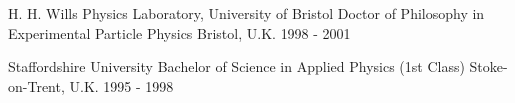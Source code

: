 

\begin{cventries}

    \award
    {H. H. Wills Physics Laboratory, University of Bristol} %
    {Doctor of Philosophy in Experimental Particle Physics} %
    {Bristol, U.K.} %
    {1998 - 2001} %
    {}

    \award
    {Staffordshire University} %
    {Bachelor of Science in Applied Physics (1st Class)} %
    {Stoke-on-Trent, U.K.} %
    {1995 - 1998} %
    {}


\end{cventries}